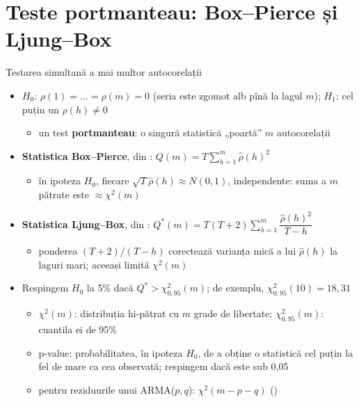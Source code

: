 \section{Teste portmanteau: Box--Pierce și Ljung--Box}

\begin{frame}{Testarea simultană a mai multor autocorelații}
\itemsize{\small}
\begin{itemize}
    \item $H_0$: $\rho(1) = \dots = \rho(m) = 0$ (seria este zgomot alb pînă la lagul $m$); $H_1$: cel puțin un $\rho(h) \ne 0$
    \begin{itemize}
        \item un test \textbf{portmanteau}: o singură statistică „poartă” $m$ autocorelații
    \end{itemize}
    \item \textbf{Statistica Box--Pierce}, din : $Q(m) = T\sum_{h=1}^{m}\hat\rho(h)^2$
    \begin{itemize}
        \item în ipoteza $H_0$, fiecare $\sqrt{T}\hat\rho(h) \approx N(0, 1)$, independente: suma a $m$ pătrate este $\approx \chi^2(m)$
    \end{itemize}
    \item \textbf{Statistica Ljung--Box}, din : $Q^*(m) = T(T + 2)\sum_{h=1}^{m}\dfrac{\hat\rho(h)^2}{T - h}$
    \begin{itemize}
        \item ponderea $(T + 2)/(T - h)$ corectează varianța mică a lui $\hat\rho(h)$ la laguri mari; aceeași limită $\chi^2(m)$
    \end{itemize}
    \item Respingem $H_0$ la 5\% dacă $Q^* > \chi^2_{0{,}95}(m)$; de exemplu, $\chi^2_{0{,}95}(10) = 18{,}31$
    \begin{itemize}
        \item $\chi^2(m)$: distribuția hi-pătrat cu $m$ grade de libertate; $\chi^2_{0{,}95}(m)$: cuantila ei de 95\%
        \item p-value: probabilitatea, în ipoteza $H_0$, de a obține o statistică cel puțin la fel de mare ca cea observată; respingem dacă este sub 0,05
        \item pentru reziduurile unui ARMA($p, q$): $\chi^2(m - p - q)$ ()
    \end{itemize}
\end{itemize}
\end{frame}

